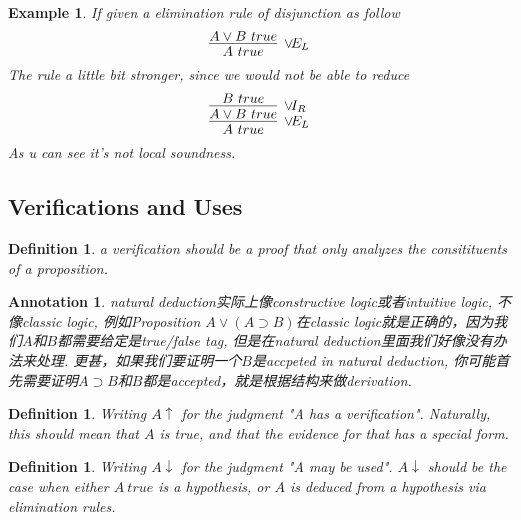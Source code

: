 \documentclass{article}
\theoremstyle{plain}
\newtheorem{example}[theorem]{Example}
\newtheorem{definition}[theorem]{Definition}
\newtheorem{annotation}[theorem]{Annotation}
\theoremstyle{nonumberplain}
\newcommand{\redt}[1]{\textcolor{red}{#1}}
\begin{document}
\begin{example}
\rm If given a elimination rule of disjunction as follow
$$
\infer[\vee\!E_L]{A~true}{A \vee B~true}
$$
The rule a little bit stronger, since we would not be able to reduce
$$
\infer[\vee\!E_L]{A~true}{\infer[\vee\!I_R]{A \vee B~true}{B~true}}
$$
As u can see it's not local soundness. 
\end{example}







\newpage
\subsection{Verifications and Uses}

\begin{definition}
\rm a verification should be a proof that only analyzes the consitituents of a proposition.
\end{definition}

\begin{annotation}
\rm natural deduction实际上像constructive logic或者intuitive logic,  不像classic logic, 例如Proposition $A \vee (A \supset B)$在classic logic就是正确的，因为我们$A$和$B$都需要给定是true/false tag, 但是在natural deduction里面我们好像没有办法来处理. 更甚，如果我们要证明一个$B$是accpeted in natural deduction, 你可能首先需要证明$A \supset B$和$B$都是accepted，就是根据结构来做derivation. 
\end{annotation}


\begin{definition}
\rm Writing $A\uparrow$ for the judgment "A has a verification". Naturally, this should mean that $A$ is true,  and that the evidence for that has a special form.
\end{definition}

\begin{definition}
\rm Writing $A\downarrow$ for the judgment "A may be used". $A\downarrow$ should be the case when either $A~true$ is a hypothesis, or $A$ is deduced from a hypothesis via elimination rules. 
\end{definition}
\end{document}
